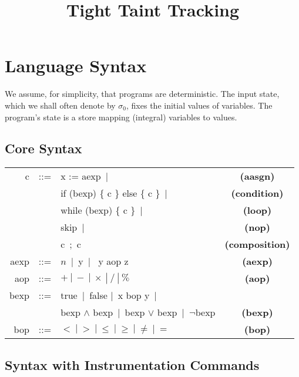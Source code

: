\documentclass[]{article}
\title{Tight Taint Tracking}
\author{}
\begin{document}
\maketitle

\section{Language Syntax}

We assume, for simplicity, that programs are deterministic. The input state, which we shall often denote by $\sigma_0$, fixes the initial values of variables. The program's state is a store mapping (integral) variables to values.

\subsection{Core Syntax}

\begin{tabular}{rclc}
{\sf c} & ::= & {\sf x := aexp}\ $|$ & {\bf (aasgn)}\\
		 & 	 & {\sf if (bexp) \{ c \} else \{ c \}}\ $|$ & {\bf (condition)}\\
		 & 	 & {\sf while (bexp) \{ c \}}\ $|$ & {\bf (loop)}\\
		 		 & 	 & {\sf skip}\ $|$ & {\bf (nop)}\\
		 & 	 & {\sf c\ ;\ c} & {\bf (composition)}\\
{\sf aexp} & ::= & $n$\ $|$\ {\sf y}\ $|$\
{\sf y aop z} & {\bf (aexp)} \\
{\sf aop} & ::= & $+\ |\ -\ |\ \times\ |\ /\ |\ \%$ & {\bf (aop)} \\
{\sf bexp} & ::= & {\sf true}\ $|$\ {\sf false} $|$\ {\sf x bop y}\ $|$ & \\ %
& 		 & {\sf bexp} $\wedge$ {\sf bexp}\ $|$\ {\sf bexp} $\vee$ {\sf bexp}\ $|$\ $\neg${\sf bexp} & {\bf (bexp)} \\ %
{\sf bop} & ::= & $<\ |\ >\ |\ \leq\ |\ \geq\ |\ \neq\ |\ =$ & {\bf (bop)}
\end{tabular}

\subsection{Syntax with Instrumentation Commands}
\end{document}
